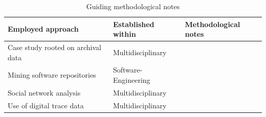 \documentclass[CHICAGO,Times1COL]{WileyNJDv5} %
\begin{document}
 \begin{table}[h]
\centering
\small
\caption{Guiding methodological notes\label{t:mul_aproach}}
 \begin{threeparttable}
\begin{tabular}{|l|m{3.1cm}|m{4.3cm}|} %
\toprule
Employed approach & Established within & Methodological notes \\
 \midrule
     {Case study rooted on archival data} & Multidisciplinary &
     { 
     \citet{yin2011} \newline 
     \citet{DubePare2003}}\\
\hline
 {Mining software repositories} & Software-Engineering &  
  \citet{kagdi2007survey} \newline 
  \citet{martinez2008using}\\
\hline

 {Social network analysis} &
 Multidisciplinary &
 
 {%
 \citet{CarringtonScott_et_al2005} \newline 
 \citet{kane_et_al2014_SNA_at_MISQ}
 }\\

\hline
  {Use of digital trace data} &
  {\centering   Multidisciplinary }&

 { %
  \citet{Teixeira2023}   \newline
 \citet{GrisoldKremser_et_al2024} %
 } \\


\end{tabular}
\end{threeparttable}
\end{table}
\end{document}
